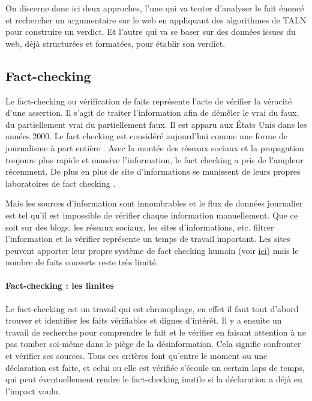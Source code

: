 On discerne donc ici deux approches, l'une qui va tenter d'analyser le fait énoncé et rechercher un argumentaire sur le web en appliquant des algorithmes de TALN pour construire un verdict. Et l'autre qui va se baser sur des données issues du web, déjà structurées et formatées, pour établir son verdict.

\subsection{Fact-checking}

Le fact-checking ou vérification de faits représente l'acte de vérifier la véracité d'une assertion. Il s'agit de traiter l'information afin de démêler le vrai du faux, du partiellement vrai du partiellement faux. Il est apparu aux États Unis dans les années 2000. Le fact checking est considéré aujourd'hui comme une forme de journalisme à part entière \cite{lemonde_fact_check_nouveaute_journalistique}. Avec la montée des réseaux sociaux et la propagation toujours plus rapide et massive l'information, le fact checking a pris de l'ampleur récemment. De plus en plus de site d'informations se munissent de leurs propres laboratoires de fact checking \cite{memoire_fact_check_nouveaute_journalistique}. 

Mais les sources d'information sont innombrables et le flux de données journalier est tel qu'il est impossible de vérifier chaque information manuellement. Que ce soit sur des blogs, les réseaux sociaux, les sites d'informations, etc. filtrer l'information et la vérifier représente un temps de travail important. Les sites peuvent apporter leur propre système de fact checking humain (voir \href{http://decodeurs.blog.lemonde.fr/}{ici}) mais le nombre de faits couverts reste très limité.

\paragraph{Fact-checking : les limites}

Le fact-checking est un travail qui est chronophage, en effet il faut tout d'abord trouver et identifier les faits vérifiables et dignes d'intérêt. Il y a ensuite un travail de recherche pour comprendre le fait et le vérifier en faisant attention à ne pas tomber soi-même dans le piège de la désinformation. Cela signifie confronter et vérifier ses sources. 
Tous ces critères font qu'entre le moment ou une déclaration est faite, et celui ou elle est vérifiée s'écoule un certain laps de temps, qui peut éventuellement rendre le fact-checking inutile si la déclaration a déjà eu l'impact voulu.


